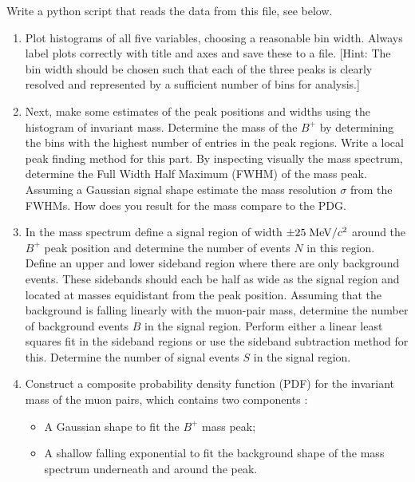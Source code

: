 Write a python script that reads the data from this file, see below. 


\begin{enumerate}

\item Plot histograms of all five variables, choosing a reasonable bin width. Always label plots correctly with title and axes and save these to a file. [Hint: The bin width should be chosen such that each of the three peaks is clearly resolved and represented by a sufficient number of bins for analysis.]

\item Next, make some estimates of the peak positions and widths using the histogram of invariant mass.  Determine the mass of the $B^+$  by determining the bins with the highest number of entries in the peak regions. Write a local peak finding method for this part. By inspecting visually the mass spectrum, determine the Full Width Half Maximum (FWHM) of the mass peak. Assuming a Gaussian signal shape estimate the mass resolution $\sigma$ from the FWHMs. How does you result for the mass compare to the PDG.

\item In the  mass spectrum define a signal region of width $\pm 25\; {\rm MeV}/c^2$ around the $B^+$  peak position and determine the number of events $N$ in this region.
  Define an upper and lower sideband region where there are only background events. These sidebands should each be half as wide as the signal region and located at masses equidistant from the peak position. Assuming that the background is falling linearly with the muon-pair mass, determine the number of background events $B$ in the signal region. Perform either a linear least squares fit in the sideband regions or use the sideband subtraction method for this. Determine the number of signal events $S$ in the signal region.

\item Construct a composite probability density
function (PDF) for the invariant mass of the muon pairs, which
contains two components : 
\begin{itemize}
\item A Gaussian shape to fit the  $B^+$ mass peak;
\item A shallow falling exponential to fit the background shape of the mass spectrum underneath and around the peak.
\end{itemize}


\end{enumerate}
